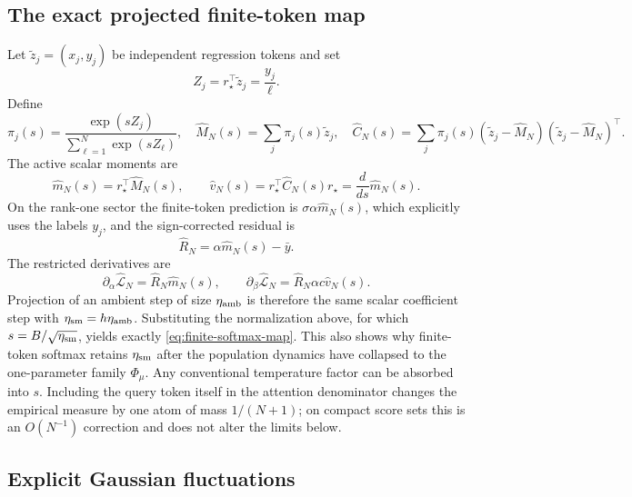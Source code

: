 \documentclass[11pt]{article}
\begin{document}
\subsection{The exact projected finite-token map}

Let \(\widetilde z_j=(x_j,y_j)\) be independent regression tokens and set
\[
Z_j=r_\star^\top\widetilde z_j=\frac{y_j}{\ell}.
\]
Define
\[
\pi_j(s)=\frac{\exp(sZ_j)}{\sum_{\ell=1}^N\exp(sZ_\ell)},\quad
\widehat M_N(s)=\sum_j\pi_j(s)\widetilde z_j,\quad
\widehat C_N(s)=
\sum_j\pi_j(s)(\widetilde z_j-\widehat M_N)
(\widetilde z_j-\widehat M_N)^\top.
\]
The active scalar moments are
\[
\widehat m_N(s)=r_\star^\top\widehat M_N(s),\qquad
\widehat v_N(s)=r_\star^\top\widehat C_N(s)r_\star
=\frac{d}{ds}\widehat m_N(s).
\]
On the rank-one sector the finite-token prediction is
\(\sigma\alpha\widehat m_N(s)\), which explicitly uses the labels \(y_j\),
and the sign-corrected residual is
\[
\widehat R_N=\alpha\widehat m_N(s)-\bar y.
\]
The restricted derivatives are
\[
\partial_\alpha\widehat{\mathcal L}_N
=\widehat R_N\widehat m_N(s),\qquad
\partial_\beta\widehat{\mathcal L}_N
=\widehat R_N\alpha c\widehat v_N(s).
\]
Projection of an ambient step of size \(\eta_{\rm amb}\) is therefore the
same scalar coefficient step with \(\eta_{\rm sm}=h\eta_{\rm amb}\).
Substituting the normalization above, for which
\(s=B/\sqrt{\eta_{\rm sm}}\), yields exactly
\eqref{eq:finite-softmax-map}.  This also shows why finite-token softmax
retains \(\eta_{\rm sm}\) after the population dynamics have collapsed to
the one-parameter family \(\Phi_\mu\).
Any conventional temperature factor can be absorbed into \(s\).  Including
the query token itself in the attention denominator changes the empirical
measure by one atom of mass \(1/(N+1)\); on compact score sets this is an
\(O(N^{-1})\) correction and does not alter the limits below.

\subsection{Explicit Gaussian fluctuations}
\end{document}
